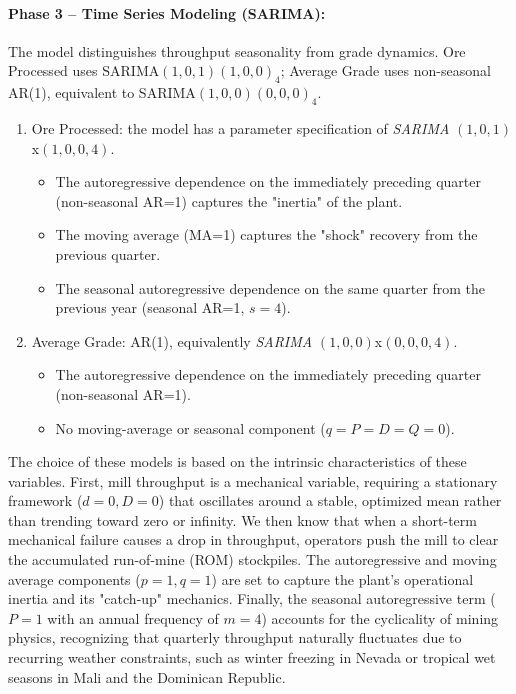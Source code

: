 \paragraph{Phase 3 -- Time Series Modeling (SARIMA):}
The model distinguishes throughput seasonality from grade dynamics. Ore
Processed uses SARIMA$(1,0,1)(1,0,0)_4$; Average Grade uses non-seasonal
AR(1), equivalent to SARIMA$(1,0,0)(0,0,0)_4$.

\begin{enumerate}
\item Ore Processed: the model has a parameter specification of \textit{SARIMA} $(1,0,1)$x$(1,0,0,4)$. 
    \begin{itemize}
        \item The autoregressive dependence on the immediately preceding quarter (non-seasonal AR=1) captures the "inertia" of the plant.
        \item The moving average (MA=1) captures the "shock" recovery from the previous quarter.
        \item The seasonal autoregressive dependence on the same quarter from the previous year (seasonal AR=1, $s=4$).
    \end{itemize}

\item Average Grade: AR(1), equivalently \textit{SARIMA} $(1,0,0)$x$(0,0,0,4)$.
    \begin{itemize}
        \item The autoregressive dependence on the immediately preceding quarter (non-seasonal AR=1).
        \item No moving-average or seasonal component ($q=P=D=Q=0$).
    \end{itemize}
\end{enumerate}

The choice of these models is based on the intrinsic characteristics of these variables. First, mill throughput is a mechanical variable, requiring a stationary framework ($d=0, D=0$) that oscillates around a stable, optimized mean rather than trending toward zero or infinity. We then know that when a short-term mechanical failure causes a drop in throughput, operators push the mill to clear the accumulated run-of-mine (ROM) stockpiles. The autoregressive and moving average components ($p=1, q=1$) are set to capture the plant's operational inertia and its "catch-up" mechanics.  Finally, the seasonal autoregressive term ($P=1$ with an annual frequency of $m=4$) accounts for the cyclicality of mining physics, recognizing that quarterly throughput naturally fluctuates due to recurring weather constraints, such as winter freezing in Nevada or tropical wet seasons in Mali and the Dominican Republic. 

